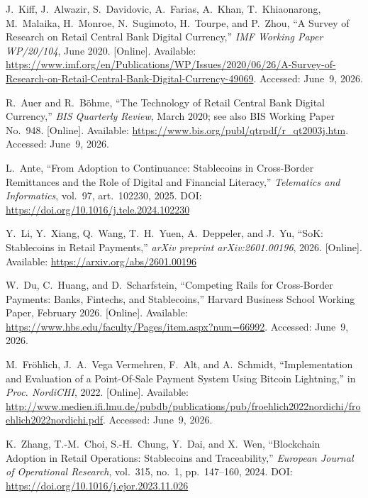 \documentclass[12pt, a4paper]{report}
\begin{document}
{\begin{enumerate}[label={[\arabic*]}]
\item J.~Kiff, J.~Alwazir, S.~Davidovic, A.~Farias, A.~Khan, T.~Khiaonarong, M.~Malaika, H.~Monroe, N.~Sugimoto, H.~Tourpe, and P.~Zhou, ``A Survey of Research on Retail Central Bank Digital Currency,'' \textit{IMF Working Paper WP/20/104}, June 2020. [Online]. Available: \url{https://www.imf.org/en/Publications/WP/Issues/2020/06/26/A-Survey-of-Research-on-Retail-Central-Bank-Digital-Currency-49069}. Accessed: June~9, 2026.

\item R.~Auer and R.~B\"{o}hme, ``The Technology of Retail Central Bank Digital Currency,'' \textit{BIS Quarterly Review}, March 2020; see also BIS Working Paper No.~948. [Online]. Available: \url{https://www.bis.org/publ/qtrpdf/r_qt2003j.htm}. Accessed: June~9, 2026.

\item L.~Ante, ``From Adoption to Continuance: Stablecoins in Cross-Border Remittances and the Role of Digital and Financial Literacy,'' \textit{Telematics and Informatics}, vol.~97, art.~102230, 2025. DOI: \url{https://doi.org/10.1016/j.tele.2024.102230}

\item Y.~Li, Y.~Xiang, Q.~Wang, T.~H.~Yuen, A.~Deppeler, and J.~Yu, ``SoK: Stablecoins in Retail Payments,'' \textit{arXiv preprint arXiv:2601.00196}, 2026. [Online]. Available: \url{https://arxiv.org/abs/2601.00196}

\item W.~Du, C.~Huang, and D.~Scharfstein, ``Competing Rails for Cross-Border Payments: Banks, Fintechs, and Stablecoins,'' Harvard Business School Working Paper, February 2026. [Online]. Available: \url{https://www.hbs.edu/faculty/Pages/item.aspx?num=66992}. Accessed: June~9, 2026.

\item M.~Fr\"{o}hlich, J.~A.~Vega Vermehren, F.~Alt, and A.~Schmidt, ``Implementation and Evaluation of a Point-Of-Sale Payment System Using Bitcoin Lightning,'' in \textit{Proc. NordiCHI}, 2022. [Online]. Available: \url{http://www.medien.ifi.lmu.de/pubdb/publications/pub/froehlich2022nordichi/froehlich2022nordichi.pdf}. Accessed: June~9, 2026.

\item K.~Zhang, T.-M.~Choi, S.-H.~Chung, Y.~Dai, and X.~Wen, ``Blockchain Adoption in Retail Operations: Stablecoins and Traceability,'' \textit{European Journal of Operational Research}, vol.~315, no.~1, pp.~147--160, 2024. DOI: \url{https://doi.org/10.1016/j.ejor.2023.11.026}


\end{enumerate}}
\end{document}

